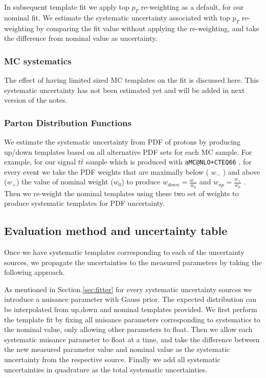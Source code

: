 \documentclass{cmspaperpdf}
\begin{document}
In subsequent template fit we apply top $p_T$ re-weighting as a default, for our nominal fit. We estimate the systematic uncertainty associated with top $p_T$ re-weighting by comparing the fit value without applying the re-weighting, and take the difference from nominal value as uncertainty. 

\subsubsection{MC systematics}

The effect of having limited sized MC templates on the fit is discussed here. This systematic uncertainty has not been estimated yet and will be added in next version of the notes.

\subsubsection{Parton Distribution Functions}

We estimate the systematic uncertainty from PDF of protons by producing up/down templates based on all alternative PDF sets for each MC sample. For example, for our signal $t\bar{t}$ sample which is produced with \texttt{aMC@NLO+CTEQ66} , for every event we take the PDF weights that are maximally below ( $w_-$ ) and above ($w_+$) the value of nominal weight ($w_0$) to produce $w_{down}=\frac{w_-}{w_0}$ and $w_{up}=\frac{w_+}{w_0}$ . Then we re-weight the nominal templates using these two set of weights to produce systematic templates for PDF uncertainty. 

\subsection{Evaluation method and uncertainty table}

Once we have systematic templates corresponding to each of the uncertainty sources, we propagate the uncertainties to the measured parameters by taking the following approach. 

As mentioned in Section.\ref{sec:fitter} for every systematic uncertainty sources we introduce a nuisance parameter with Gauss prior. The expected distribution can be interpolated from up,down and nominal templates provided. We first perform the template fit by fixing all nuisance parameters corresponding to systematics to the nominal value, only allowing other parameters to float. Then we allow each systematic nuisance parameter to float at a time, and take the difference between the new measured parameter value and nominal value as the systematic uncertainty from the respective source. Finally we add all systematic uncertainties in quadrature  as the total systematic uncertainties. 
\end{document}
